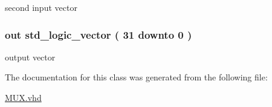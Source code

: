 second input vector 

\hypertarget{class_m_u_x_aba4981bcab558ff1bfef133843d39d43}{
\subsubsection[{vector\-\_\-out}]{ {\bfseries out } {\bfseries std\-\_\-logic\-\_\-vector (   31    downto    0  ) } }}\label{class_m_u_x_aba4981bcab558ff1bfef133843d39d43}


output vector 



\-The documentation for this class was generated from the following file\-:\begin{DoxyCompactItemize}
\item 
\hyperlink{_m_u_x_8vhd}{\-M\-U\-X.\-vhd}\end{DoxyCompactItemize}
